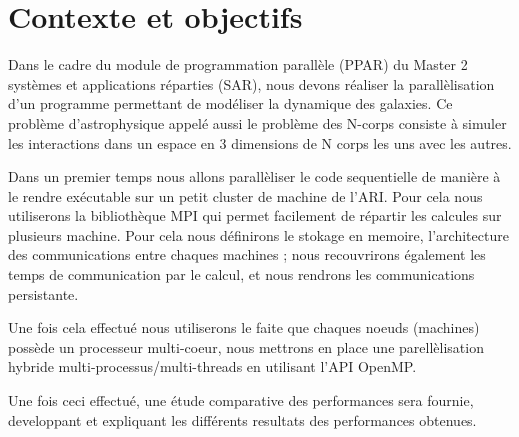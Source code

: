 \section{Contexte et objectifs}
\par Dans le cadre du module de programmation parallèle (PPAR)
du Master 2 systèmes et applications réparties (SAR), nous devons réaliser
la parallèlisation d'un programme permettant de modéliser la dynamique des galaxies.
Ce problème d'astrophysique appelé aussi le problème des N-corps consiste à 
simuler les interactions dans un espace en 3 dimensions de N corps les uns avec
les autres.
\par Dans un premier temps nous allons parallèliser le code sequentielle de manière 
à le rendre exécutable sur un petit cluster de machine de l'ARI. Pour cela nous 
utiliserons la bibliothèque MPI qui permet facilement de répartir les calcules sur 
plusieurs machine. Pour cela nous définirons le stokage en memoire, l'architecture des
communications entre chaques machines ; nous recouvrirons également les temps de 
communication par le calcul, et nous rendrons les communications persistante.
\par Une fois cela effectué nous utiliserons le faite que chaques noeuds (machines)
possède un processeur multi-coeur, nous mettrons en place une parellèlisation hybride
multi-processus/multi-threads en utilisant l'API OpenMP.
\par Une fois ceci effectué, une étude comparative des performances sera fournie,
developpant et expliquant les différents resultats des performances obtenues.

